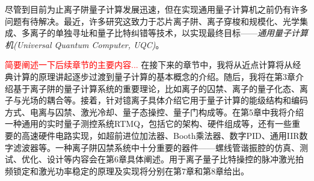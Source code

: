 尽管到目前为止离子阱量子计算发展迅速，但在实现通用量子计算机之前仍有许多问题有待解决。最近，许多研究这致力于芯片离子阱\cite[]{Mehta_Eltony_Bruzewicz_Chuang_Ram_Sage_Chiaverini_2014}、离子穿梭和规模化\cite[]{Monroe_Kim_2013, Sterling_Rattanasonti_Weidt_Lake_Srinivasan_Webster_Kraft_Hensinger_2014, Lee_Jeong_Park_Jung_Kim_Cho_2021}、光学集成\cite[]{Niffenegger_Stuart_Sorace_Agaskar_Kharas_Bramhavar_Bruzewicz_Loh_Maxson_McConnell_Reens_et_al_2020, Mehta_Zhang_Malinowski_Nguyen_Stadler_Home_2020}、多离子的单独寻址\cite[]{Ivory_Setzer_Karl_McGuinness_DeRose_Blain_Stick_Gehl_Parazzoli_2020}和量子比特纠错\cite[]{Cramer_Kalb_Rol_Hensen_Blok_Markham_Twitchen_Hanson_Taminiau_2016,Reichardt_2021}等技术，以实现最终目标——\emph{通用量子计算机(Universal Quantum Computer, UQC)}。

\textcolor{red}{简要阐述一下后续章节的主要内容...}
在接下来的章节中，我将从近点计算将从经典计算的原理讲起逐步过渡到量子计算的基本概念的介绍。随后，我将在第3章介绍基于离子阱的量子计算系统的重要理论，比如离子的囚禁、离子的量子化态、离子与光场的耦合等。接着，针对镱离子具体介绍它用于量子计算的能级结构和编码方式、电离与囚禁、激光冷却、量子态操控、量子门构成等。在第5章中我将介绍一种通用的实时量子测控系统RTMQ，包括它的架构、硬件组成等，还有一些重要的高速硬件电路实现，如超前进位加法器、Booth乘法器、数字PID、通用IIR数字滤波器等。一种离子阱囚禁系统中十分重要的器件——螺线管谐振腔的仿真、测试、优化、设计等内容会在第6章具体阐述。用于离子量子比特操控的脉冲激光拍频锁定和激光功率稳定的原理及实现将分别在第7章和第8章给出。